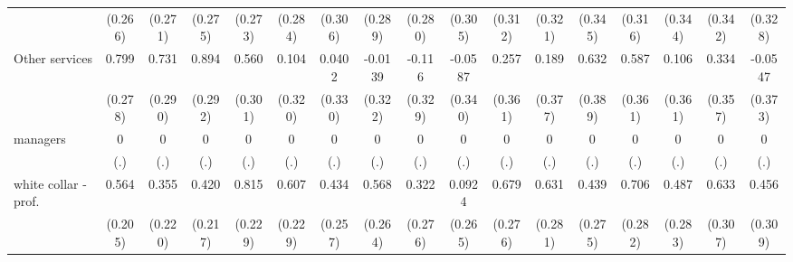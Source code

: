 {\begin{tabular}{l*{16}{c}}
                    &     (0.266)         &     (0.271)         &     (0.275)         &     (0.273)         &     (0.284)         &     (0.306)         &     (0.289)         &     (0.280)         &     (0.305)         &     (0.312)         &     (0.321)         &     (0.345)         &     (0.316)         &     (0.344)         &     (0.342)         &     (0.328)         \\
[1em]
Other services      &       0.799\sym{**} &       0.731\sym{*}  &       0.894\sym{**} &       0.560         &       0.104         &      0.0402         &     -0.0139         &      -0.116         &     -0.0587         &       0.257         &       0.189         &       0.632         &       0.587         &       0.106         &       0.334         &     -0.0547         \\
                    &     (0.278)         &     (0.290)         &     (0.292)         &     (0.301)         &     (0.320)         &     (0.330)         &     (0.322)         &     (0.329)         &     (0.340)         &     (0.361)         &     (0.377)         &     (0.389)         &     (0.361)         &     (0.361)         &     (0.357)         &     (0.373)         \\
[1em]
managers            &           0         &           0         &           0         &           0         &           0         &           0         &           0         &           0         &           0         &           0         &           0         &           0         &           0         &           0         &           0         &           0         \\
                    &         (.)         &         (.)         &         (.)         &         (.)         &         (.)         &         (.)         &         (.)         &         (.)         &         (.)         &         (.)         &         (.)         &         (.)         &         (.)         &         (.)         &         (.)         &         (.)         \\
[1em]
white collar - prof.&       0.564\sym{**} &       0.355         &       0.420         &       0.815\sym{***}&       0.607\sym{**} &       0.434         &       0.568\sym{*}  &       0.322         &      0.0924         &       0.679\sym{*}  &       0.631\sym{*}  &       0.439         &       0.706\sym{*}  &       0.487         &       0.633\sym{*}  &       0.456         \\
                    &     (0.205)         &     (0.220)         &     (0.217)         &     (0.229)         &     (0.229)         &     (0.257)         &     (0.264)         &     (0.276)         &     (0.265)         &     (0.276)         &     (0.281)         &     (0.275)         &     (0.282)         &     (0.283)         &     (0.307)         &     (0.309)         \\

\end{tabular}}
